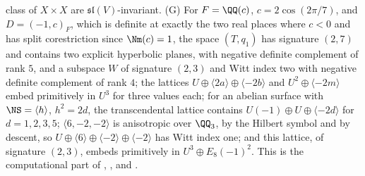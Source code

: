 \begin{enumerate}[label=\textup{(\Roman*)},leftmargin=*]
  class of $X\times X$ are $\mathfrak{sl}(V)$-invariant. (G) For
  $F=\QQ(c)$, $c=2\cos(2\pi/7)$, and $D=(-1,c)_{F}$, which is definite at
  exactly the two real places where $c<0$ and has split corestriction since
  $\Nm(c)=1$, the space $(T,q_{1})$ has signature $(2,7)$ and contains two
  explicit hyperbolic planes, with negative definite complement of rank $5$,
  and a subspace $W$ of signature $(2,3)$ and Witt index two with negative
  definite complement of rank $4$; the lattices $U\oplus\langle2a\rangle
  \oplus\langle-2b\rangle$ and $U^{2}\oplus\langle-2m\rangle$ embed
  primitively in $U^{3}$ for three values each; for an abelian surface with
  $\NS=\langle h\rangle$, $h^{2}=2d$, the transcendental lattice contains
  $U(-1)\oplus U\oplus\langle-2d\rangle$ for $d=1,2,3,5$;
  $\langle6,-2,-2\rangle$ is anisotropic over $\QQ_{3}$, by the Hilbert
  symbol and by descent, so $U\oplus\langle6\rangle\oplus\langle-2\rangle
  \oplus\langle-2\rangle$ has Witt index one; and this lattice, of signature
  $(2,3)$, embeds primitively in $U^{3}\oplus E_{8}(-1)^{2}$. This is the
  computational part of , ,
   and .


\end{enumerate}
